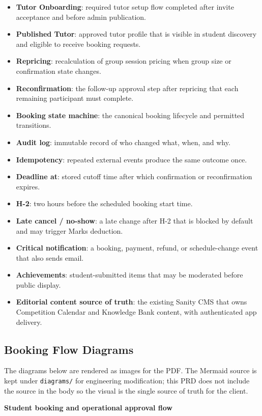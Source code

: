 \documentclass[11pt,a4paper]{article}
\begin{document}
\begin{itemize}
	\item \textbf{Tutor Onboarding}: required tutor setup flow completed after invite acceptance and before admin publication.
	\item \textbf{Published Tutor}: approved tutor profile that is visible in student discovery and eligible to receive booking requests.
	\item \textbf{Repricing}: recalculation of group session pricing when group size or confirmation state changes.
	\item \textbf{Reconfirmation}: the follow-up approval step after repricing that each remaining participant must complete.
	\item \textbf{Booking state machine}: the canonical booking lifecycle and permitted transitions.
	\item \textbf{Audit log}: immutable record of who changed what, when, and why.
	\item \textbf{Idempotency}: repeated external events produce the same outcome once.
	\item \textbf{Deadline at}: stored cutoff time after which confirmation or reconfirmation expires.
	\item \textbf{H-2}: two hours before the scheduled booking start time.
	\item \textbf{Late cancel / no-show}: a late change after H-2 that is blocked by default and may trigger Marks deduction.
	\item \textbf{Critical notification}: a booking, payment, refund, or schedule-change event that also sends email.
	\item \textbf{Achievements}: student-submitted items that may be moderated before public display.
\item \textbf{Editorial content source of truth}: the existing Sanity CMS that owns Competition Calendar and Knowledge Bank content, with authenticated app delivery.
\end{itemize}

\subsection{Booking Flow Diagrams}

The diagrams below are rendered as images for the PDF. The Mermaid source is kept under \texttt{diagrams/} for engineering modification; this PRD does not include the source in the body so the visual is the single source of truth for the client.

\textbf{Student booking and operational approval flow}
\end{document}
